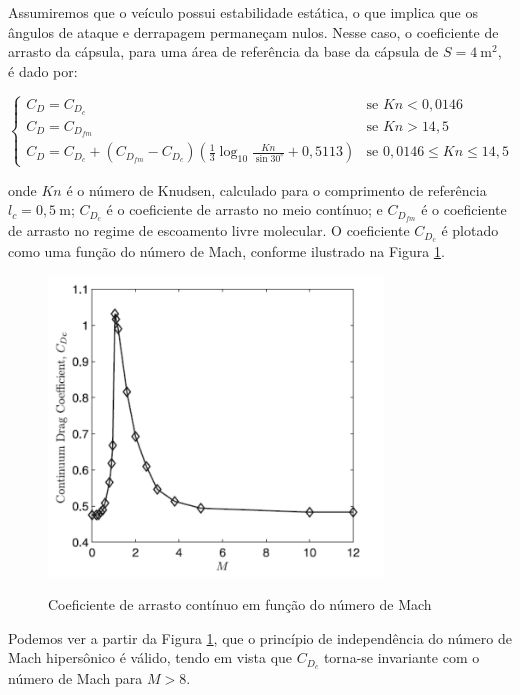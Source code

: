 Assumiremos que o veículo possui estabilidade estática, o que implica que os ângulos de ataque e derrapagem permaneçam nulos. Nesse caso, o coeficiente de arrasto da cápsula, para uma área de referência da base da cápsula de $S=4 \mathrm{~m}^{2}$, é dado por:

\begin{equation}
\left\{
\begin{array}{lr}
C_{D}=C_{D_{c}} & \text{se } K n<0,0146 \\
C_{D}=C_{D_{f m}} & \text{se } K n>14,5 \\
C_{D}=C_{D_{c}}+\left(C_{D_{f m}}-C_{D_{c}}\right)\left(\frac{1}{3} \log _{10} \frac{K n}{\sin 30^{\circ}}+0,5113\right) & \text{se } 0,0146 \leq K n \leq 14,5
\end{array}
\right.
\end{equation}

onde $K n$ é o número de Knudsen, calculado para o comprimento de referência $l_{c}=0,5 \mathrm{~m}$; $C_{D_{c}}$ é o coeficiente de arrasto no meio contínuo; e $C_{D_{f m}}$ é o coeficiente de arrasto no regime de escoamento livre molecular. O coeficiente $C_{D_{c}}$ é plotado como uma função do número de Mach, conforme ilustrado na Figura \ref{fig:aerodin}.

\begin{figure}[H]
    \begin{center}
        \caption{Coeficiente de arrasto contínuo em função do número de Mach}
        \includegraphics[width=3.5in]{figuras/mach.png}
        \label{fig:aerodin}
     \end{center}
\end{figure}

Podemos ver a partir da Figura \ref{fig:aerodin}, que o princípio de independência do número de Mach hipersônico é válido, tendo em vista que $C_{D_c}$ torna-se invariante com o número de Mach para $M > 8$.




